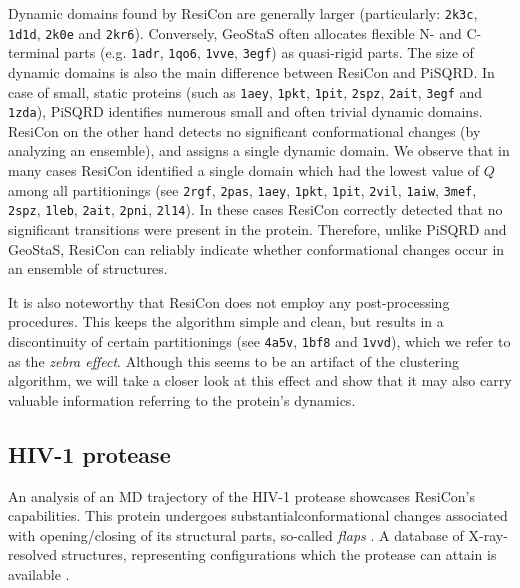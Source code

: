 Dynamic domains found by ResiCon are generally larger (particularly: \texttt{2k3c}, \texttt{1d1d}, \texttt{2k0e} and \texttt{2kr6}).
Conversely, GeoStaS often allocates flexible N- and C-terminal parts (e.g. \texttt{1adr}, \texttt{1qo6}, \texttt{1vve}, \texttt{3egf}) as quasi-rigid parts.
The size of dynamic domains is also the main difference between ResiCon and PiSQRD.
In case of small, static proteins (such as \texttt{1aey}, \texttt{1pkt}, \texttt{1pit}, \texttt{2spz}, \texttt{2ait}, \texttt{3egf} and \texttt{1zda}), PiSQRD identifies numerous small and often trivial dynamic domains. 
ResiCon on the other hand detects no significant conformational changes (by analyzing an ensemble), and assigns a single dynamic domain.
We observe that in many cases ResiCon identified a single domain which had the lowest value of $Q$ among all partitionings (see \texttt{2rgf}, \texttt{2pas}, \texttt{1aey}, \texttt{1pkt}, \texttt{1pit}, \texttt{2vil}, \texttt{1aiw}, \texttt{3mef}, \texttt{2spz}, \texttt{1leb}, \texttt{2ait}, \texttt{2pni}, \texttt{2l14}).
In these cases ResiCon correctly detected that no significant transitions were present in the protein.
Therefore, unlike PiSQRD and GeoStaS, ResiCon can reliably indicate whether conformational changes occur in an ensemble of structures.

It is also noteworthy that ResiCon does not employ any post-processing procedures.
This keeps the algorithm simple and clean, but results in a discontinuity of certain partitionings (see \texttt{4a5v}, \texttt{1bf8} and \texttt{1vvd}), which we refer to as the \emph{zebra effect}.
Although this seems to be an artifact of the clustering algorithm, we will take a closer look at this effect and show that it may also carry valuable information referring to the protein's dynamics.

\subsection*{HIV-1 protease}
An analysis of an MD trajectory of the HIV-1 protease showcases ResiCon's capabilities.
This protein undergoes substantial\break conformational changes associated with opening/closing of its structural parts, so-called \emph{flaps} \cite{hamelberg2005fast}.
A database of X-ray-resolved structures, representing configurations which the protease can attain is available \cite{vondrasek2002hivdb}.

